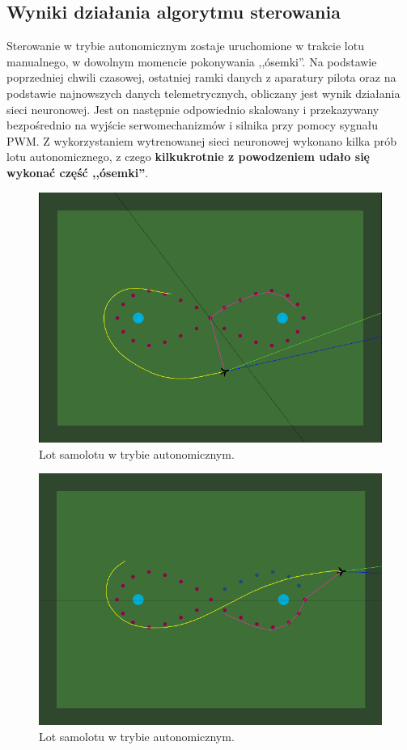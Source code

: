 \documentclass[12pt, a4paper]{article}
\begin{document}
\subsection{Wyniki działania algorytmu sterowania}
Sterowanie w trybie autonomicznym zostaje uruchomione w trakcie lotu manualnego, w dowolnym momencie pokonywania ,,ósemki''. Na podstawie poprzedniej chwili czasowej, ostatniej ramki danych z aparatury pilota oraz na podstawie najnowszych danych telemetrycznych, obliczany jest wynik działania sieci neuronowej. Jest on następnie odpowiednio skalowany i przekazywany bezpośrednio na wyjście serwomechanizmów i silnika przy pomocy sygnału PWM. Z wykorzystaniem wytrenowanej sieci neuronowej wykonano kilka prób lotu autonomicznego, z czego \textbf{kilkukrotnie z powodzeniem udało się wykonać część ,,ósemki''}. 

 \begin{figure}[H]
    \centering
    \includegraphics[width=1\textwidth]{aileci1}
    \caption{Lot samolotu w trybie autonomicznym.}
    \label{fig:leci1}
\end{figure}

 \begin{figure}[H]
    \centering
    \includegraphics[width=1\textwidth]{aileci2}
    \caption{Lot samolotu w trybie autonomicznym.}
    \label{fig:leci2}
\end{figure}
\end{document}
